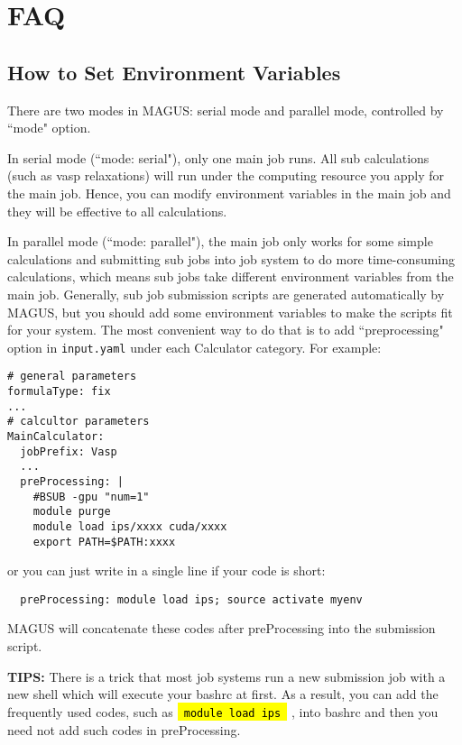 \documentclass[12pt,oneside]{book}
\newcommand{\code}[1]{
  \begingroup
  \sethlcolor{Seashell}
  {\hl{\texttt{~#1~}}}
  \endgroup
}
\newcommand{\file}[1]{\texttt{#1}}
\begin{document}
\chapter{FAQ}
\section{How to Set Environment Variables}\label{sec: preprocessing}
There are two modes in MAGUS: serial mode and parallel mode, controlled by ``mode" option.

In serial mode (``mode: serial"), only one main job runs. All sub calculations (such as vasp relaxations) will run under the computing resource you apply for the main job. Hence, you can modify environment variables in the main job and they will be effective to all calculations.

In parallel mode (``mode: parallel"), the main job only works for some simple calculations and submitting sub jobs into job system to do more time-consuming calculations, which means sub jobs take different environment variables from the main job. Generally, sub job submission scripts are generated automatically by MAGUS, but you should add some environment variables to make the scripts fit for your system. The most convenient way to do that is to add ``preprocessing" option in \file{input.yaml} under each Calculator category. For example:
\begin{tcolorbox}
    \begin{verbatim}
# general parameters
formulaType: fix
...
# calcultor parameters
MainCalculator:
  jobPrefix: Vasp
  ...
  preProcessing: |
    #BSUB -gpu "num=1"
    module purge
    module load ips/xxxx cuda/xxxx
    export PATH=$PATH:xxxx
    \end{verbatim}
\end{tcolorbox}
or you can just write in a single line if your code is short:
\begin{tcolorbox}
    \begin{verbatim}
  preProcessing: module load ips; source activate myenv
    \end{verbatim}
\end{tcolorbox}
MAGUS will concatenate these codes after preProcessing into the submission script.

\textbf{TIPS:} There is a trick that most job systems run a new submission job with a new shell which will execute your bashrc at first. As a result, you can add the frequently used codes, such as \code{module load ips}, into bashrc and then you need not add such codes in preProcessing.
\end{document}

